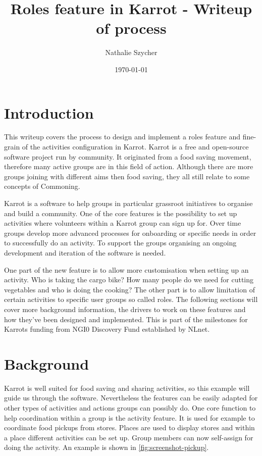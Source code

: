 \documentclass[
	a4paper,%
	11pt,%
	]{article}
\begin{document}
\title{Roles feature in Karrot - Writeup of process}

\author{Nathalie Szycher}
\date{\today}

\maketitle
\tableofcontents


\section{Introduction}

This writeup covers the process to design and implement a roles feature and fine-grain of the activities configuration in Karrot. Karrot is a free and open-source software project run by community. It originated from a food saving movement, therefore many active groups are in this field of action. Although there are more groups joining with different aims then food saving, they all still relate to some concepts of Commoning.

Karrot is a software to help groups in particular grassroot initiatives to organise and build a community. One of the core features is the possibility to set up activities where volunteers within a Karrot group can sign up for. Over time groups develop more advanced processes for onboarding or specific needs in order to successfully do an activity. To support the groups organising an ongoing development and iteration of the software is needed.

One part of the new feature is to allow more customisation when setting up an activity. Who is taking the cargo bike? How many people do we need for cutting vegetables and who is doing the cooking? The other part is to allow limitation of certain activities to specific user groups so called roles. The following sections will cover more background information, the drivers to work on these features and how they've been designed and implemented. This is part of the milestones for Karrots funding from NGI0 Discovery Fund established by NLnet.



\section{Background}

Karrot is well suited for food saving and sharing activities, so this example will guide us through the software. Nevertheless the features can be easily adapted for other types of activities and actions groups can possibly do. One core function to help coordination within a group is the activity feature. It is used for example to coordinate food pickups from stores. Places are used to display stores and within a place different activities can be set up. Group members can now self-assign for doing the activity. An example is shown in \autoref{fig:screenshot-pickup}.
\end{document}
